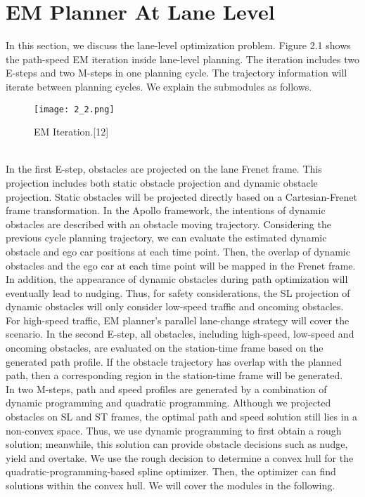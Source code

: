 \documentclass{report}
\begin{document}
\section{EM Planner At Lane Level}
In this section, we discuss the lane-level optimization problem. Figure 2.1 shows the path-speed EM iteration inside lane-level planning. The iteration includes two E-steps and two M-steps in one planning cycle. The trajectory information will iterate between planning cycles. We explain the submodules as follows.
    \begin{figure}[ht]
	\centering
	\texttt{[image: 2\_2.png]}
	\caption{EM Iteration.[12]}
	\label{fig:2.2} 
\end{figure}\\
\indent
In the first E-step, obstacles are projected on the lane Frenet frame. This projection includes both static obstacle projection and dynamic obstacle projection. Static obstacles will be projected directly based on a Cartesian-Frenet frame transformation. In the Apollo framework, the intentions of dynamic obstacles are described with an obstacle moving trajectory. Considering the previous cycle planning trajectory, we can evaluate the estimated dynamic obstacle and ego car positions at each time point. Then, the overlap of dynamic obstacles and the ego car at each time point will be mapped in the Frenet frame. In addition, the appearance of dynamic obstacles during path optimization will eventually lead to nudging. Thus, for safety considerations, the SL projection of dynamic obstacles will only consider low-speed traffic and oncoming obstacles. For high-speed traffic, EM planner’s parallel lane-change strategy will cover the scenario. In the second E-step, all obstacles, including high-speed, low-speed and oncoming obstacles, are evaluated on the station-time frame based on the generated path profile. If the obstacle trajectory has overlap with the planned path, then a corresponding region in the station-time frame will be generated.\\
\indent
In two M-steps, path and speed profiles are generated by a combination of dynamic programming and quadratic programming. Although we projected obstacles on SL and ST frames, the optimal path and speed solution still lies in a non-convex space. Thus, we use dynamic programming to first obtain a rough solution; meanwhile, this solution can provide obstacle decisions such as nudge, yield and overtake. We use the rough decision to determine a convex hull for the quadratic-programming-based spline optimizer. Then, the optimizer can find solutions within the convex hull. We will cover the modules in the following.
\end{document}
